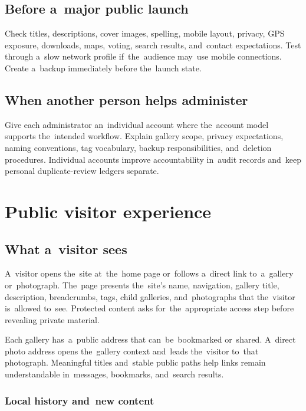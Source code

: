 \documentclass[11pt,a4paper]{article}
\begin{document}
\subsection{Before a~major public launch}

Check titles, descriptions, cover images, spelling, mobile layout, privacy, GPS
exposure, downloads, maps, voting, search results, and~contact expectations.
Test through a~slow network profile if~the~audience may~use mobile connections.
Create a~backup immediately before the~launch state.

\subsection{When another person helps administer}

Give each administrator an~individual account where the~account model supports
the~intended workflow. Explain gallery scope, privacy expectations, naming
conventions, tag vocabulary, backup responsibilities, and~deletion procedures.
Individual accounts improve accountability in~audit records and~keep personal
duplicate-review ledgers separate.

\section{Public visitor experience}
\label{sec:public}

\subsection{What a~visitor sees}

A~visitor opens the~site at~the~home page or~follows a~direct link to~a~gallery
or~photograph. The~page presents the~site's name, navigation, gallery title,
description, breadcrumbs, tags, child galleries, and~photographs that
the~visitor is~allowed to~see. Protected content asks for~the~appropriate access
step before revealing private material.

Each gallery has~a~public address that can~be~bookmarked or~shared. A~direct
photo address opens the~gallery context and~leads the~visitor to~that
photograph. Meaningful titles and~stable public paths help links remain
understandable in~messages, bookmarks, and~search results.

\subsubsection{Local history and~new content}
\end{document}
